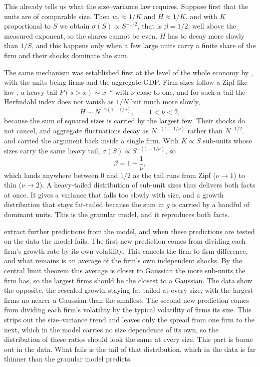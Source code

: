 This already tells us what the size--variance law requires. Suppose first that the units are
of comparable size. Then $w_i \approx 1/K$ and $H \approx 1/K$, and with $K$ proportional to
$S$ we obtain $\sigma(S) \propto S^{-1/2}$, that is $\beta = 1/2$, well above the measured
exponent, so the shares cannot be even. $H$ has to decay more slowly than $1/S$,
and this happens only when a few large units carry a finite share of the firm and their shocks
dominate the sum.

The same mechanism was established first at the level of the whole economy by
\citet{gabaix2011}, with the units being firms and the aggregate GDP. Firm sizes follow a
Zipf-like law \citep{axtell2001}, a heavy tail $P(s > x) \sim x^{-\nu}$ with $\nu$ close to one, and for such a
tail the Herfindahl index does not vanish as $1/N$ but much more slowly,
\begin{equation}
  H \sim N^{-2\left(1 - 1/\nu\right)}, \qquad 1 < \nu < 2,
\end{equation}
because the sum of squared sizes is carried by the largest few. Their shocks do not cancel,
and aggregate fluctuations decay as $N^{-(1 - 1/\nu)}$ rather than $N^{-1/2}$.
\citet{sutton2002} and \citet{wyartbouchaud2003} carried the argument back inside a single
firm. With $K \propto S$ sub-units whose sizes carry the same heavy tail,
$\sigma(S) \propto S^{-(1 - 1/\nu)}$, so
\begin{equation}
  \beta = 1 - \frac{1}{\nu},
  \label{eq:intro-beta-nu}
\end{equation}
which lands anywhere between $0$ and $1/2$ as the tail runs from Zipf ($\nu \to 1$) to thin
($\nu \to 2$). A heavy-tailed distribution of sub-unit sizes thus delivers both facts at once. It
gives a variance that falls too slowly with size, and a growth distribution that stays
fat-tailed because the sum in $g$ is carried by a handful of dominant units. This is the granular
model, and it reproduces both facts.

\citet{moran2024} extract further predictions from the model, and when these predictions are
tested on the data the model fails. The first new prediction comes from dividing each firm's
growth rate by its own volatility. This cancels the firm-to-firm difference, and what remains
is an average of the firm's own independent shocks. By the central limit theorem this average
is closer to Gaussian the more sub-units the firm has, so the largest firms should be the
closest to a Gaussian. The data show the opposite, the rescaled growth staying fat-tailed at
every size, with the largest firms no nearer a Gaussian than the smallest. The second new
prediction comes from dividing each firm's volatility by the typical volatility of firms its
size. This strips out the size--variance trend and leaves only the spread from one firm to the
next, which in the model carries no size dependence of its own, so the distribution of these
ratios should look the same at every size. This part is borne out in the data. What fails is
the tail of that distribution, which in the data is far thinner than the granular model
predicts.

